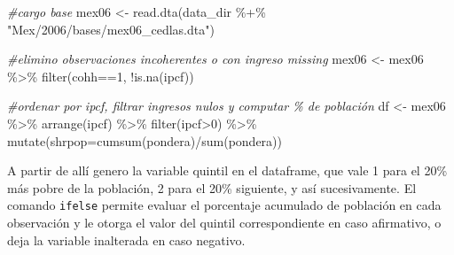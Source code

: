\documentclass[
]{book}
\newenvironment{Shaded}{\begin{snugshade}}{\end{snugshade}}
\newcommand{\AttributeTok}[1]{\textcolor[rgb]{0.77,0.63,0.00}{#1}}
\newcommand{\CommentTok}[1]{\textcolor[rgb]{0.56,0.35,0.01}{\textit{#1}}}
\newcommand{\DecValTok}[1]{\textcolor[rgb]{0.00,0.00,0.81}{#1}}
\newcommand{\FunctionTok}[1]{\textcolor[rgb]{0.00,0.00,0.00}{#1}}
\newcommand{\NormalTok}[1]{#1}
\newcommand{\OtherTok}[1]{\textcolor[rgb]{0.56,0.35,0.01}{#1}}
\newcommand{\SpecialCharTok}[1]{\textcolor[rgb]{0.00,0.00,0.00}{#1}}
\newcommand{\StringTok}[1]{\textcolor[rgb]{0.31,0.60,0.02}{#1}}
\begin{document}
\begin{Shaded}
\begin{Highlighting}[]
\CommentTok{\#cargo base}
\NormalTok{mex06 }\OtherTok{\textless{}{-}} \FunctionTok{read.dta}\NormalTok{(data\_dir }\SpecialCharTok{\%+\%} \StringTok{"Mex/2006/bases/mex06\_cedlas.dta"}\NormalTok{)  }

\CommentTok{\#elimino observaciones incoherentes o con ingreso missing}
\NormalTok{mex06 }\OtherTok{\textless{}{-}}\NormalTok{ mex06 }\SpecialCharTok{\%\textgreater{}\%} \FunctionTok{filter}\NormalTok{(cohh}\SpecialCharTok{==}\DecValTok{1}\NormalTok{, }\SpecialCharTok{!}\FunctionTok{is.na}\NormalTok{(ipcf)) }

\CommentTok{\#ordenar por ipcf, filtrar ingresos nulos y computar \% de población}
\NormalTok{df }\OtherTok{\textless{}{-}}\NormalTok{  mex06  }\SpecialCharTok{\%\textgreater{}\%} \FunctionTok{arrange}\NormalTok{(ipcf) }\SpecialCharTok{\%\textgreater{}\%} \FunctionTok{filter}\NormalTok{(ipcf}\SpecialCharTok{\textgreater{}}\DecValTok{0}\NormalTok{) }\SpecialCharTok{\%\textgreater{}\%} 
       \FunctionTok{mutate}\NormalTok{(}\AttributeTok{shrpop=}\FunctionTok{cumsum}\NormalTok{(pondera)}\SpecialCharTok{/}\FunctionTok{sum}\NormalTok{(pondera))}
\end{Highlighting}
\end{Shaded}

A partir de allí genero la variable quintil en el dataframe, que vale 1 para el 20\% más pobre de la población, 2 para el
20\% siguiente, y así sucesivamente. El comando \texttt{ifelse} permite evaluar el porcentaje acumulado de población en cada observación y le otorga el valor del quintil correspondiente en caso afirmativo, o deja la variable inalterada en caso negativo.
\end{document}
